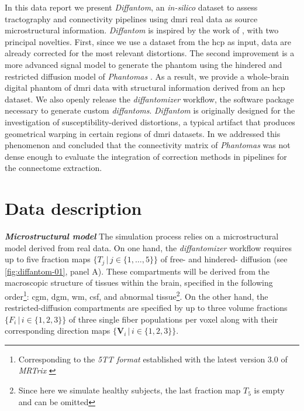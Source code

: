 \documentclass[english]{frontiers/frontiersSCNS} %
\providecommand{\diffantom}{\emph{Diffantom}}
\providecommand{\Diffantom}{\emph{Diffantom}}
\newcommand{\vmaps}{\ensuremath{\{\mathbf{V}_i \,|\, i \in \{1,2,3\}\}}}
\newcommand{\fmaps}{\ensuremath{\{F_i \,|\, i \in \{1,2,3\}\}}}
\newcommand{\tmaps}{\ensuremath{\{T_j \,|\, j \in \{1,\ldots,5\}\}}}
\begin{document}
In this data report we present \diffantom{}, an \emph{in-silico} dataset to assess tractography and connectivity
  pipelines using \gls*{dmri} real data as source microstructural information.
\Diffantom{} is inspired by the work of \cite{wilkins_fiber_2015}, with two principal novelties.
First, since we use a dataset from the \gls*{hcp} as input, data are already corrected for the most
  relevant distortions.
The second improvement is a more advanced signal model to generate the phantom using the hindered and restricted
  diffusion model of \emph{Phantomas} \citep{caruyer_phantomas_2014}.
As a result, we provide a whole-brain digital phantom of \gls*{dmri} data with structural information derived
  from an \gls*{hcp} dataset.
We also openly release the \emph{diffantomizer} workflow, the software package necessary to generate custom \emph{diffantoms}.
\Diffantom{} is originally designed for the investigation of susceptibility-derived distortions, a
  typical artifact that produces geometrical warping in certain regions of \gls*{dmri} datasets.
In \citep{esteban_simulationbased_2014} we addressed this phenomenon and concluded that the connectivity
  matrix of \emph{Phantomas} was not dense enough to evaluate the integration of correction methods
  in pipelines for the connectome extraction.

\section*{Data description}

\noindent\textbf{\textit{Microstructural model\textcolon}\label{sec:diffantom-data-micromodel}} %
The simulation process relies on a microstructural model derived from real data.
On one hand, the \emph{diffantomizer} workflow requires up to five fraction maps \tmaps{} of
  free- and hindered- diffusion (see \autoref{fig:diffantom-01}, panel A).
These compartments will be derived from the macroscopic structure of tissues within the brain,
  specified in the following order\footnote{Corresponding to the \emph{5TT format} established
  with the latest version 3.0 of \emph{MRTrix} \citep{tournier_mrtrix_2012}}:
  \gls*{cgm}, \gls*{dgm}, \gls*{wm}, \gls*{csf}, and abnormal tissue\footnote{Since here we
  simulate healthy subjects, the last fraction map $T_5$ is empty and can be omitted}.
On the other hand, the restricted-diffusion compartments are specified by up to three volume fractions \fmaps{}
  of three single fiber populations per voxel along with their corresponding direction maps \vmaps{}.
\end{document}
